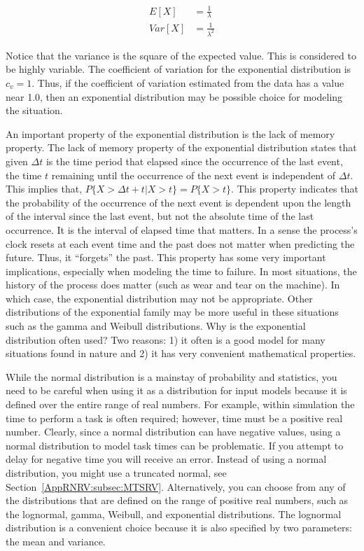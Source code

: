 \documentclass[
]{book}
\theoremstyle{definition}
\theoremstyle{definition}
\theoremstyle{definition}
\theoremstyle{definition}
\theoremstyle{remark}
\begin{document}
\[\begin{aligned}
E[X] & = \frac{1}{\lambda} \\
Var[X] & = \frac{1}{\lambda^2}\end{aligned}\]

Notice that the variance is the square of the expected value. This is
considered to be highly variable. The coefficient of variation for the
exponential distribution is \(c_v = 1\). Thus, if the coefficient of
variation estimated from the data has a value near 1.0, then an
exponential distribution may be possible choice for modeling the
situation.

An important property of the exponential distribution is the lack of
memory property. The lack of memory property of the exponential
distribution states that given \(\Delta t\) is the time period that
elapsed since the occurrence of the last event, the time \(t\) remaining
until the occurrence of the next event is independent of \(\Delta t\).
This implies that,
\(P \lbrace X > \Delta t + t|X > t \rbrace = P \lbrace X > t \rbrace\).
This property indicates that the probability of the occurrence of the
next event is dependent upon the length of the interval since the last
event, but not the absolute time of the last occurrence. It is the
interval of elapsed time that matters. In a sense the process's clock
resets at each event time and the past does not matter when predicting
the future. Thus, it ``forgets'' the past. This property has some very
important implications, especially when modeling the time to failure. In
most situations, the history of the process does matter (such as wear
and tear on the machine). In which case, the exponential distribution
may not be appropriate. Other distributions of the exponential family
may be more useful in these situations such as the gamma and Weibull
distributions. Why is the exponential distribution often used? Two
reasons: 1) it often is a good model for many situations found in nature
and 2) it has very convenient mathematical properties.

While the normal distribution is a mainstay of probability and
statistics, you need to be careful when using it as a distribution for
input models because it is defined over the entire range of real
numbers. For example, within simulation the time to perform a task is
often required; however, time must be a positive real number. Clearly,
since a normal distribution can have negative values, using a normal
distribution to model task times can be problematic. If you attempt to
delay for negative time you will receive an error. Instead of using a
normal distribution, you might use a truncated normal, see
Section~\ref{AppRNRV:subsec:MTSRV}. Alternatively, you can choose from any of the
distributions that are defined on the range of positive real numbers,
such as the lognormal, gamma, Weibull, and exponential distributions.
The lognormal distribution is a convenient choice because it is also
specified by two parameters: the mean and variance.
\end{document}
